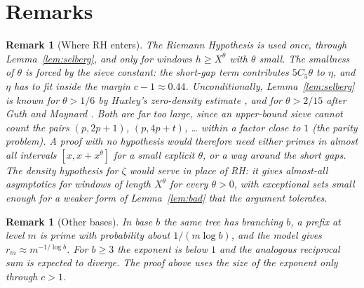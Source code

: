 \documentclass[11pt]{amsart}
\newtheorem{remark}[lemma]{Remark}
\begin{document}
\section{Remarks}

\begin{remark}[Where RH enters]
\label{rem:rh}
The Riemann Hypothesis is used once, through Lemma~\ref{lem:selberg},
and only for windows $h \ge X^\theta$ with $\theta$ small. The
smallness of $\theta$ is forced by the sieve constant: the short-gap
term contributes $5C_5\theta$ to $\eta$, and $\eta$ has to fit inside
the margin $c - 1 \approx 0.44$. Unconditionally,
Lemma~\ref{lem:selberg} is known for $\theta > 1/6$ by Huxley's
zero-density estimate \cite{Hux}, and for $\theta > 2/15$ after Guth and
Maynard \cite{GM}. Both are far too large, since an upper-bound sieve
cannot count the pairs $(p, 2p+1)$, $(p, 4p+t)$, \dots{} within a factor
close to $1$ (the parity problem). A proof with no hypothesis would
therefore need either primes in almost all intervals $[x, x + x^\theta]$
for a small explicit $\theta$, or a way around the short gaps. The
density hypothesis for $\zeta$ would serve in place of RH: it gives
almost-all asymptotics for windows of length $X^\theta$ for every
$\theta > 0$, with exceptional sets small enough for a weaker form of
Lemma~\ref{lem:bad} that the argument tolerates.
\end{remark}

\begin{remark}[Other bases]
In base $b$ the same tree has branching $b$, a prefix at level $m$ is
prime with probability about $1/(m \log b)$, and the model gives $r_m
\approx m^{-1/\log b}$. For $b \ge 3$ the exponent is below $1$ and the
analogous reciprocal sum is expected to diverge. The proof above uses
the size of the exponent only through $c > 1$.
\end{remark}
\end{document}
